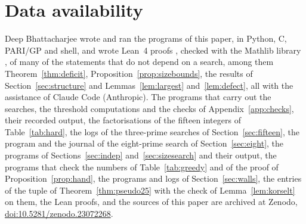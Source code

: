 \documentclass[11pt,reqno]{amsart}
\numberwithin{equation}{section}
\theoremstyle{plain}
\theoremstyle{definition}
\theoremstyle{remark}
\newcommand{\zenododoi}{10.5281/zenodo.23072268}
\begin{document}
\section*{Data availability}
Deep Bhattacharjee wrote and ran the programs of this paper, in
Python, C, PARI/GP and shell, and wrote Lean~4 proofs \cite{dMU21},
checked with the Mathlib library \cite{Mathlib}, of many of the
statements that do not depend on a search, among them Theorem~\ref{thm:deficit},
Proposition~\ref{prop:sizebounds}, the results of
Section~\ref{sec:structure} and Lemmas~\ref{lem:largest}
and~\ref{lem:defect}, all with the assistance of Claude Code
(Anthropic). The programs that carry out the searches, the threshold computations
and the checks of Appendix~\ref{app:checks}, their recorded output, the
factorisations of the fifteen integers of Table~\ref{tab:hard}, the
logs of the three-prime searches of Section~\ref{sec:fifteen}, the
program and the journal of the eight-prime search of
Section~\ref{sec:eight}, the programs of Sections~\ref{sec:indep}
and~\ref{sec:sizesearch} and their output, the programs that check the
numbers of Table~\ref{tab:greedy} and of the proof of
Proposition~\ref{prop:hand}, the programs and logs
of Section~\ref{sec:walls}, the entries of the tuple of
Theorem~\ref{thm:pseudo25} with the check of Lemma~\ref{lem:korselt}
on them, the Lean proofs, and the sources of this paper are archived
at Zenodo, \href{https://doi.org/\zenododoi}{doi:\zenododoi}.
\end{document}
